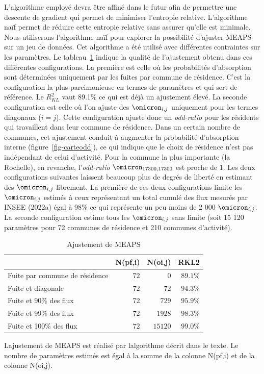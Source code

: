 \documentclass[
  10pt,
  a4paper,
  numbers=noendperiod,
  DIV=12]{scrartcl}
\begin{document}
L'algorithme employé devra être affiné dans le futur afin de permettre
une descente de gradient qui permet de minimiser l'entropie relative.
L'algorithme naïf permet de réduire cette entropie relative sans assurer
qu'elle est minimale. Nous utiliserons l'algorithme naïf pour explorer
la possibilité d'ajuster MEAPS sur un jeu de données. Cet algorithme a
été utilisé avec différentes contraintes sur les paramètres. Le
tableau~\ref{tbl-meapsR2} indique la qualité de l'ajustement obtenu dans
ces différentes configurations. La première est celle où les
probabilités d'absorption sont déterminées uniquement par les fuites par
commune de résidence. C'est la configuration la plus parcimonieuse en
termes de paramètres et qui sert de référence. Le \(R^2_{KL}\) vaut
89.1\% ce qui est déjà un ajustement élevé. La seconde configuration est
celle où l'on ajuste des \(\omicron_{i,j}\) uniquement pour les termes
diagonaux (\(i=j\)). Cette configuration ajuste donc un \emph{odd-ratio}
pour les résidents qui travaillent dans leur commune de résidence. Dans
un certain nombre de communes, cet ajustement conduit à augmenter la
probabilité d'absorption interne (figure~\ref{fig-carteodd}), ce qui
indique que le choix de résidence n'est pas indépendant de celui
d'activité. Pour la commune la plus importante (la Rochelle), en
revanche, l'\emph{odd-ratio} \(\omicron_{17300, 17300}\) est proche de
1. Les deux configurations suivantes laissent beaucoup plus de degrés de
liberté en estimant des \(\omicron_{i,j}\) librement. La première de ces
deux configurations limite les \(\omicron_{i,j}\) estimés à ceux
représentant un total cumulé des flux mesurés par INSEE (2022a) égal à
98\% ce qui représente un peu moins de 2 000 \(\omicron_{i,j}\). La
seconde configuration estime tous les \(\omicron_{i,j}\) sans limite
(soit 15 120 paramètres pour 72 communes de résidence et 210 communes
d'activité).

\hypertarget{tbl-meapsR2}{}
\setlength{\LTpost}{0mm}
\begin{longtable}{lrrr}
\caption{\label{tbl-meapsR2}Ajustement de MEAPS }\tabularnewline

\toprule
 & N(pf,i) & N(oi,j) & RKL2 \\ 
\midrule
Fuite par commune de résidence & $72$ & $0$ & $89.1\%$ \\ 
Fuite et diagonale & $72$ & $72$ & $94.3\%$ \\ 
Fuite et 90\% des flux & $72$ & $729$ & $95.9\%$ \\ 
Fuite et 99\% des flux & $72$ & $1 928$ & $98.3\%$ \\ 
Fuite et 100\% des flux & $72$ & $15 120$ & $99.0\%$ \\ 
\bottomrule
\end{longtable}
\begin{minipage}{\linewidth}
L\textquotesingle{}ajustement de MEAPS est réalisé par l\textquotesingle{}algorithme décrit dans le texte. Le nombre de paramètres estimés est égal à la somme de la colonne N(pf,i) et de la colonne N(oi,j).\\
\end{minipage}
\end{document}
